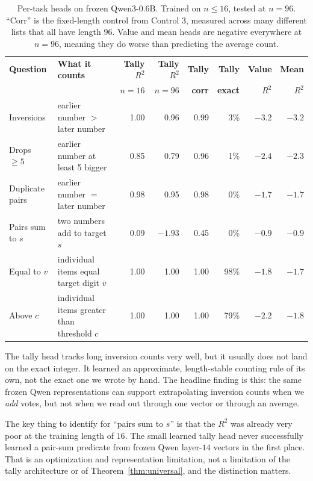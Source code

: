 \documentclass[10pt]{article}
\theoremstyle{definition}
\begin{document}
\begin{table}[htbp]
\centering
\caption{Per-task heads on frozen Qwen3-0.6B. Trained on $n \leq 16$,
tested at $n = 96$. ``Corr'' is the fixed-length control from Control 3,
measured across many different lists that all have length $96$. Value and
mean heads are negative everywhere at $n = 96$, meaning they do worse than
predicting the average count.}
\label{tab:pertask}
\small
\begin{tabular}{@{}llrrrrrr@{}}
\toprule
\textbf{Question} & \textbf{What it counts} &
\textbf{Tally $R^2$} & \textbf{Tally $R^2$} & \textbf{Tally} & \textbf{Tally} &
\textbf{Value} & \textbf{Mean} \\
 & & \textbf{$n=16$} & \textbf{$n=96$} & \textbf{corr} & \textbf{exact} &
\textbf{$R^2$} & \textbf{$R^2$} \\
\midrule
Inversions      & earlier number $>$ later number      & 1.00 & 0.96  & 0.99 & 3\%  & $-3.2$ & $-3.2$ \\
Drops $\geq 5$  & earlier number at least 5 bigger     & 0.85 & 0.79  & 0.96 & 1\%  & $-2.4$ & $-2.3$ \\
Duplicate pairs & earlier number $=$ later number      & 0.98 & 0.95  & 0.98 & 0\%  & $-1.7$ & $-1.7$ \\
Pairs sum to $s$& two numbers add to target $s$        & 0.09 & $-1.93$ & 0.45 & 0\% & $-0.9$ & $-0.9$ \\
Equal to $v$    & individual items equal target digit $v$ & 1.00 & 1.00 & 1.00 & 98\% & $-1.8$ & $-1.7$ \\
Above $c$       & individual items greater than threshold $c$ & 1.00 & 1.00 & 1.00 & 79\% & $-2.2$ & $-1.8$ \\
\bottomrule
\end{tabular}
\end{table}

The tally head tracks long inversion counts very well, but it usually does
not land on the exact integer. It learned an approximate, length-stable counting rule of its own, not the exact one we wrote by hand. The headline
finding is this: the same frozen Qwen representations can support
extrapolating inversion counts when we \emph{add} votes, but not when we
read out through one vector or through an average.

The key thing to identify for ``pairs sum to $s$'' is that the $R^2$ was
already very poor at the training length of $16$. The small learned tally
head never successfully learned a pair-sum predicate from frozen Qwen
layer-$14$ vectors in the first place. That is an optimization and
representation limitation, not a limitation of the tally architecture or
of Theorem~\ref{thm:universal}, and the distinction matters.
\end{document}
